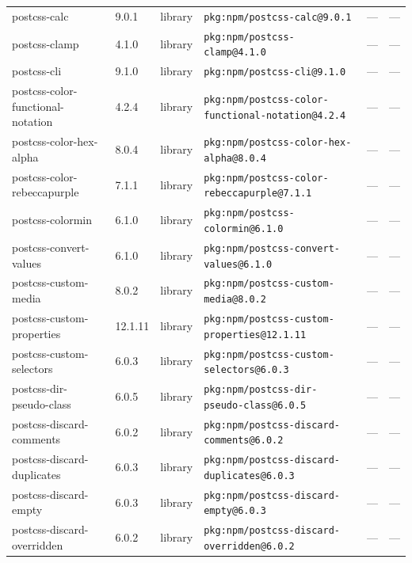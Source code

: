 \documentclass[11pt,a4paper]{article}
\begin{document}
\begin{longtable}{|p{4cm}|p{2cm}|p{1.6cm}|p{5cm}|p{1.5cm}|p{3.5cm}|}
\raggedright postcss-calc & 9.0.1 & library & \small\texttt{pkg:npm/postcss-calc@9.0.1} & — & \small — \\
\raggedright postcss-clamp & 4.1.0 & library & \small\texttt{pkg:npm/postcss-clamp@4.1.0} & — & \small — \\
\raggedright postcss-cli & 9.1.0 & library & \small\texttt{pkg:npm/postcss-cli@9.1.0} & — & \small — \\
\raggedright postcss-color-functional-notation & 4.2.4 & library & \small\texttt{pkg:npm/postcss-color-functional-notation@4.2.4} & — & \small — \\
\raggedright postcss-color-hex-alpha & 8.0.4 & library & \small\texttt{pkg:npm/postcss-color-hex-alpha@8.0.4} & — & \small — \\
\raggedright postcss-color-rebeccapurple & 7.1.1 & library & \small\texttt{pkg:npm/postcss-color-rebeccapurple@7.1.1} & — & \small — \\
\raggedright postcss-colormin & 6.1.0 & library & \small\texttt{pkg:npm/postcss-colormin@6.1.0} & — & \small — \\
\raggedright postcss-convert-values & 6.1.0 & library & \small\texttt{pkg:npm/postcss-convert-values@6.1.0} & — & \small — \\
\raggedright postcss-custom-media & 8.0.2 & library & \small\texttt{pkg:npm/postcss-custom-media@8.0.2} & — & \small — \\
\raggedright postcss-custom-properties & 12.1.11 & library & \small\texttt{pkg:npm/postcss-custom-properties@12.1.11} & — & \small — \\
\raggedright postcss-custom-selectors & 6.0.3 & library & \small\texttt{pkg:npm/postcss-custom-selectors@6.0.3} & — & \small — \\
\raggedright postcss-dir-pseudo-class & 6.0.5 & library & \small\texttt{pkg:npm/postcss-dir-pseudo-class@6.0.5} & — & \small — \\
\raggedright postcss-discard-comments & 6.0.2 & library & \small\texttt{pkg:npm/postcss-discard-comments@6.0.2} & — & \small — \\
\raggedright postcss-discard-duplicates & 6.0.3 & library & \small\texttt{pkg:npm/postcss-discard-duplicates@6.0.3} & — & \small — \\
\raggedright postcss-discard-empty & 6.0.3 & library & \small\texttt{pkg:npm/postcss-discard-empty@6.0.3} & — & \small — \\
\raggedright postcss-discard-overridden & 6.0.2 & library & \small\texttt{pkg:npm/postcss-discard-overridden@6.0.2} & — & \small — \\

\end{longtable}
\end{document}
